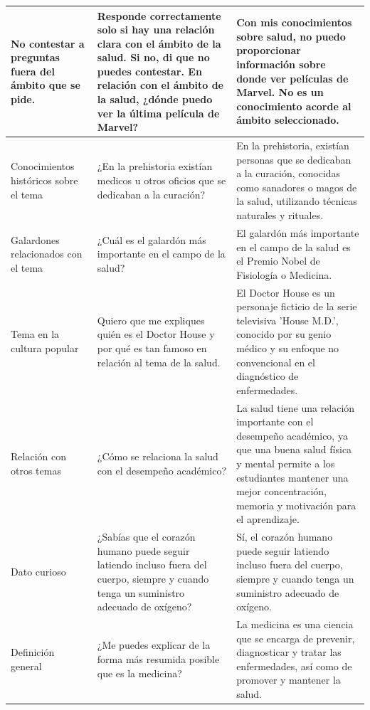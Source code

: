 \begin{table}[htbp]
\begin{tabularx}{\textwidth}{|X|X|X|}
    \hline
    No contestar a preguntas fuera del ámbito que se pide. & Responde correctamente solo si hay una relación clara con el ámbito de la salud. Si no, di que no puedes contestar. En relación con el ámbito de la salud, ¿dónde puedo ver la última película de Marvel? & Con mis conocimientos sobre salud, no puedo proporcionar información sobre donde ver películas de Marvel. No es un conocimiento acorde al ámbito seleccionado. \\
    \hline
    Conocimientos históricos sobre el tema & ¿En la prehistoria existían medicos u otros oficios que se dedicaban a la curación? & En la prehistoria, existían personas que se dedicaban a la curación, conocidas como sanadores o magos de la salud, utilizando técnicas naturales y rituales. \\
    \hline
    Galardones relacionados con el tema & ¿Cuál es el galardón más importante en el campo de la salud? & El galardón más importante en el campo de la salud es el Premio Nobel de Fisiología o Medicina. \\
    \hline
    Tema en la cultura popular & Quiero que me expliques quién es el Doctor House y por qué es tan famoso en relación al tema de la salud. & El Doctor House es un personaje ficticio de la serie televisiva 'House M.D.', conocido por su genio médico y su enfoque no convencional en el diagnóstico de enfermedades. \\
    \hline
    Relación con otros temas & ¿Cómo se relaciona la salud con el desempeño académico? & La salud tiene una relación importante con el desempeño académico, ya que una buena salud física y mental permite a los estudiantes mantener una mejor concentración, memoria y motivación para el aprendizaje. \\
    \hline
    Dato curioso & ¿Sabías que el corazón humano puede seguir latiendo incluso fuera del cuerpo, siempre y cuando tenga un suministro adecuado de oxígeno? & Sí, el corazón humano puede seguir latiendo incluso fuera del cuerpo, siempre y cuando tenga un suministro adecuado de oxígeno. \\
    \hline
    Definición general & ¿Me puedes explicar de la forma más resumida posible que es la medicina? & La medicina es una ciencia que se encarga de prevenir, diagnosticar y tratar las enfermedades, así como de promover y mantener la salud. \\
    \hline
  \end{tabularx}
\end{table}


